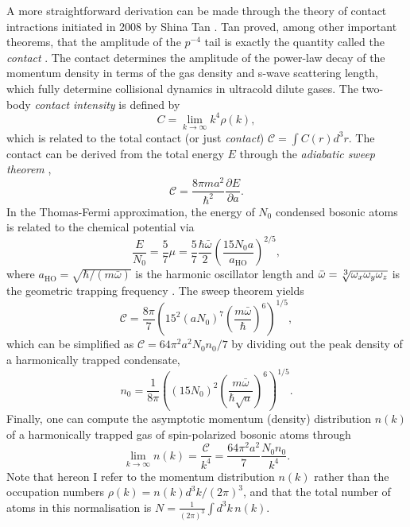 	A more straightforward derivation can be made through the theory of contact intractions initiated in 2008 by Shina Tan \cite{Tan08_momentum,Tan08_virial,Tan08_energetics}.
	Tan proved, among other important theorems, that the amplitude of the $p^{-4}$ tail is exactly the quantity called the \emph{contact} \cite{Tan08_momentum, Braaten11}.
	The contact determines the amplitude of the power-law decay of the momentum density in terms of the gas density and s-wave scattering length, which fully determine collisional dynamics in ultracold dilute gases. 
	The two-body \emph{contact intensity} is defined by \cite{Tan08_momentum,Braaten11}
	\begin{equation}
		C = \lim_{k\rightarrow\infty}k^4\rho(k),
		\label{eqn:MomentumDef}
	\end{equation}
	which is related to the total contact (or just \emph{contact})  $\mathcal{C} = \int C(r) d^3 r$.
	The contact can be derived from the total energy $E$ through the \emph{adiabatic sweep theorem} \cite{Tan08_energetics},
	\begin{equation}
		\mathcal{C} = \frac{8\pi m a^2}{\hbar^2}\frac{\partial E}{\partial a}.
		\label{eqn:sweep_theorem}
	\end{equation}
	In the Thomas-Fermi approximation, the energy of $N_0$ condensed bosonic atoms is related to the chemical potential via
	\begin{equation}
		\frac{E}{N_0} = \frac{5}{7}\mu = \frac{5}{7} \frac{\hbar \bar{\omega}}{2} \left(\frac{15 N_0 a}{a_\textrm{HO}}\right)^{2/5},
		\label{mu}
	\end{equation}
	where $a_\textrm{HO} = \sqrt{\hbar/(m \bar{\omega})}$ is the harmonic oscillator length and $\bar{\omega}=\sqrt[\uproot{2}\scriptstyle 3]{\omega_x \omega_y \omega_z}$ is the geometric trapping frequency \cite{PitaevskiiStringari,PethickSmith}. The sweep theorem yields
	\begin{equation}
		\mathcal{C} = \frac{8\pi}{7} \left(15^{2}(a N_0)^{7} \left(\frac{m \bar{\omega}}{\hbar}\right)^{6}\right)^{1/5},
		\label{eqn:TotalHarmonicContact}
	\end{equation}
	which can be simplified as $\mathcal{C} = 64\pi^2a^2 N_0 n_0/7$ by dividing out the peak density of a harmonically trapped condensate,
	\begin{equation}
		n_0 = \frac{1}{8 \pi}\left( (15N_0)^2 \left(\frac{m \bar{\omega}}{\hbar\sqrt{a}}\right)	 ^{6}\right)^{1/5}.
		\label{eqn:n0}
	\end{equation}
	Finally, one can compute the asymptotic momentum (density) distribution $n(k)$ of a harmonically trapped gas of spin-polarized bosonic atoms through
	\begin{equation}
		\lim_{k\rightarrow\infty} n(k) = {\frac{\mathcal{C}}{k^4}} = \frac{64\pi^2a^2}{7} \frac{N_0n_0}{k^4}.
		\label{eqn:pred_scaling}
	\end{equation}
	Note that hereon I refer to the momentum distribution $n(k)$ rather than the occupation numbers $\rho(k) = n(k) d^3k/(2\pi)^3$, and that
    the total number of atoms in this normalisation is $N=\frac{1}{(2\pi)^3}\int d^3 k\, n(k)$.

